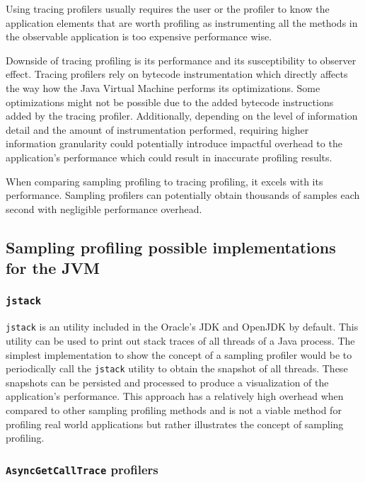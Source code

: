 \documentclass[..thesis.tex]{subfiles}
\begin{document}
Using tracing profilers usually requires the user or the profiler to know the application elements that are worth profiling as instrumenting all the methods in the observable application is too expensive performance wise. 

Downside of tracing profiling is its performance and its susceptibility to observer effect. Tracing profilers rely on bytecode instrumentation which directly affects the way how the Java Virtual Machine performs its optimizations. Some optimizations might not be possible due to the added bytecode instructions added by the tracing profiler. Additionally, depending on the level of information detail and the amount of instrumentation performed, requiring higher information granularity could potentially introduce impactful overhead to the application's performance which could result in inaccurate profiling results. 

When comparing sampling profiling to tracing profiling, it excels with its performance. Sampling profilers can potentially obtain thousands of samples each second with negligible performance overhead.

\subsection{Sampling profiling possible implementations for the JVM}

\subsubsection{\texttt{jstack}}
\texttt{jstack} is an utility included in the Oracle's JDK and OpenJDK by default. This utility can be used to print out stack traces of all threads of a Java process.\cite{jstack} The simplest implementation to show the concept of a sampling profiler would be to periodically call the \texttt{jstack} utility to obtain the snapshot of all threads. These snapshots can be persisted and processed to produce a visualization of the application's performance. This approach has a relatively high overhead when compared to other sampling profiling methods and is not a viable method for profiling real world applications but rather illustrates the concept of sampling profiling.

\subsubsection{\texttt{AsyncGetCallTrace} profilers}
\end{document}

